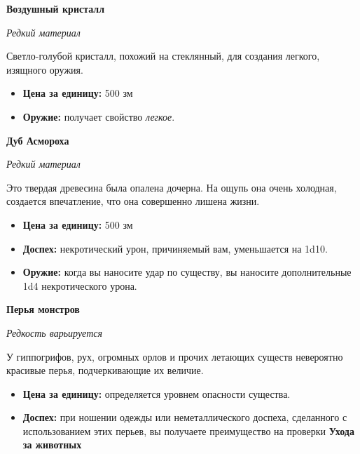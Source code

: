 \documentclass[a4paper, 9pt, twocolumn]{book}
\begin{document}
	\noindent\textbf{Воздушный кристалл}
	
	\noindent \textit{Редкий материал}
	
	\smallskip
	
	\noindent Светло-голубой кристалл, похожий на стеклянный, для создания легкого, изящного оружия.
	
	\smallskip
	
	\begin{itemize}
		\item \textbf{Цена за единицу:} 500 зм
		
		\item \textbf{Оружие:} получает свойство \textit{легкое}.
	\end{itemize}

	\noindent \textbf{Дуб Асмороха}
	
	\noindent \textit{Редкий материал}
	
	\smallskip
	
	\noindent Это твердая древесина была опалена дочерна. На ощупь она очень холодная, создается впечатление, что она совершенно лишена жизни.
	
	\begin{itemize}
		\item \textbf{Цена за единицу:} 500 зм
		
		\item \textbf{Доспех:} некротический урон, причиняемый вам, уменьшается на 1d10.
		
		\item \textbf{Оружие:} когда вы наносите удар по существу, вы наносите дополнительные 1d4 некротического урона.
	\end{itemize}

	\noindent \textbf{Перья монстров}
	
	\noindent \textit{Редкость варьируется}
	
	\smallskip
	
	\noindent У гиппогрифов, рух, огромных орлов и прочих летающих существ невероятно красивые перья, подчеркивающие их величие.
	
	\begin{itemize}
		\item \textbf{Цена за единицу:} определяется уровнем опасности существа.
		
		\item \textbf{Доспех:} при ношении одежды или неметаллического доспеха, сделанного с использованием этих перьев, вы получаете преимущество на проверки \textbf{Ухода за  животных}
	\end{itemize}
\end{document}
